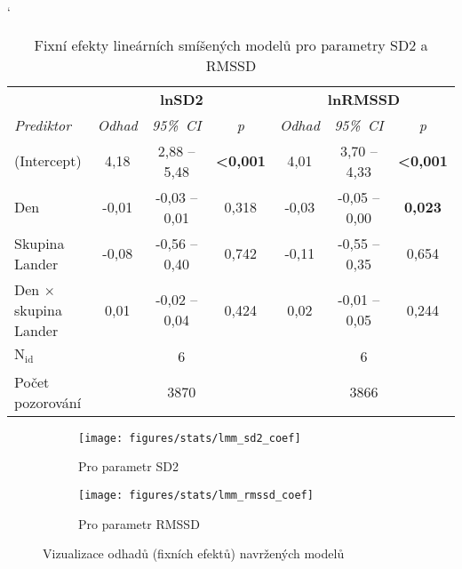 \begin{table}[h]
    \catcode`
    \footnotesize
    \centering
    \caption{Fixní efekty lineárních smíšených modelů pro parametry SD2 a RMSSD}
    \begin{threeparttable}
        \begin{tabular*}{\linewidth}{@{\extracolsep{\fill}} lcccccc @{}}
            \toprule
            & \multicolumn{3}{c}{\textbf{lnSD2}} & \multicolumn{3}{c}{\textbf{lnRMSSD}}                                                                      \\ \cmidrule(rl){2-4} \cmidrule(rl){5-7}
            \textit{Prediktor}          & \textit{Odhad}                      & \textit{95\%~CI}                          & \textit{p}      & \textit{Odhad} & \textit{95\%~CI}   & \textit{p}      \\ \midrule
            (Intercept)                 & 4,18                                & 2,88 -- 5,48                         & \textbf{<0,001} & 4,01           & 3,70 -- 4,33  & \textbf{<0,001} \\
            Den                         & -0,01                               & -0,03 -- 0,01                        & 0,318           & -0,03          & -0,05 -- 0,00 & \textbf{0,023}  \\
            Skupina Lander              & -0,08                               & -0,56 -- 0,40                        & 0,742           & -0,11          & -0,55 -- 0,35 & 0,654           \\
            Den $\times$ skupina Lander & 0,01                                & -0,02 -- 0,04                        & 0,424           & 0,02           & -0,01 -- 0,05 & 0,244           \\ \midrule
            $\mathrm{N}_{\text{id}}$    & \multicolumn{3}{c}{6}               & \multicolumn{3}{c}{6}                                                                                     \\
            Počet pozorování            & \multicolumn{3}{c}{3870}            & \multicolumn{3}{c}{3866}                                                                                  \\
            \bottomrule
        \end{tabular*}
    \end{threeparttable}
    \label{tab:lmm_rmssd_SD2}
\end{table}

\begin{figure}[!htb]
    \centering
    \begin{subfigure}[h]{0.43\linewidth}
        \texttt{[image: figures/stats/lmm\_sd2\_coef]}
        \caption{Pro parametr SD2}
    \end{subfigure}
    \hfill
    \begin{subfigure}[h]{0.43\linewidth}
        \texttt{[image: figures/stats/lmm\_rmssd\_coef]}
        \caption{Pro parametr RMSSD}
    \end{subfigure}
    \caption{Vizualizace odhadů (fixních efektů) navržených modelů}
    \label{fig:results_lmm_coefs1}
\end{figure}

